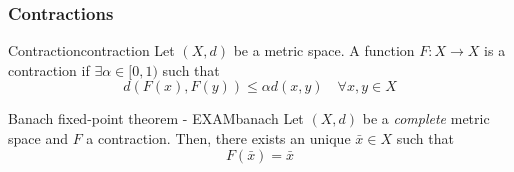 \documentclass[12pt]{extarticle}
\begin{document}
\subsubsection{Contractions}

\begin{definition}{Contraction}{contraction}
	Let $(X, d)$ be a metric space.
	A function $F: X \to X$ is a contraction if $\exists \alpha \in [0, 1)$
	such that
	\begin{equation}
		d(F(x), F(y)) \leq \alpha d(x, y) \quad \forall x, y \in X
	\end{equation}
\end{definition}

\begin{theorem}{Banach fixed-point theorem - EXAM}{banach}
	Let $(X, d)$ be a \emph{complete} metric space and $F$ a contraction.
	Then, there exists an unique $\bar x \in X$ such that
	\begin{equation}
		F(\bar x) = \bar x
	\end{equation}
\end{theorem}
\end{document}
